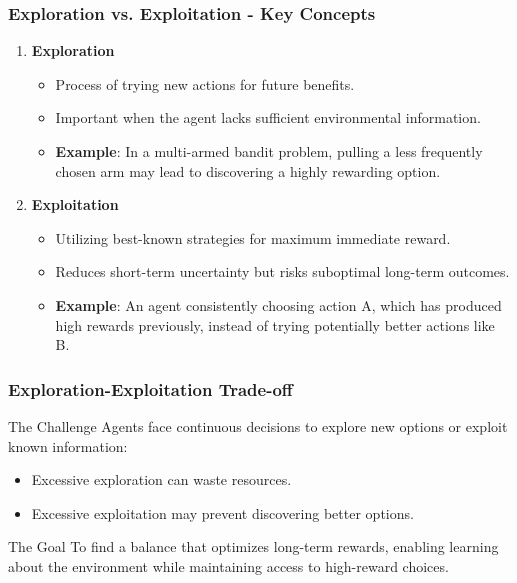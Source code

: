 \documentclass[aspectratio=169]{beamer}
\begin{document}
\begin{frame}[fragile]
    \frametitle{Exploration vs. Exploitation - Key Concepts}
    \begin{enumerate}
        \item \textbf{Exploration}
            \begin{itemize}
                \item Process of trying new actions for future benefits.
                \item Important when the agent lacks sufficient environmental information.
                \item \textbf{Example}: In a multi-armed bandit problem, pulling a less frequently chosen arm may lead to discovering a highly rewarding option.
            \end{itemize}
        \item \textbf{Exploitation}
            \begin{itemize}
                \item Utilizing best-known strategies for maximum immediate reward.
                \item Reduces short-term uncertainty but risks suboptimal long-term outcomes.
                \item \textbf{Example}: An agent consistently choosing action A, which has produced high rewards previously, instead of trying potentially better actions like B.
            \end{itemize}
    \end{enumerate}
\end{frame}

\begin{frame}[fragile]
    \frametitle{Exploration-Exploitation Trade-off}
    \begin{block}{The Challenge}
        Agents face continuous decisions to explore new options or exploit known information:
        \begin{itemize}
            \item Excessive exploration can waste resources.
            \item Excessive exploitation may prevent discovering better options.
        \end{itemize}
    \end{block}
    \begin{block}{The Goal}
        To find a balance that optimizes long-term rewards, enabling learning about the environment while maintaining access to high-reward choices.
    \end{block}
\end{frame}
\end{document}
